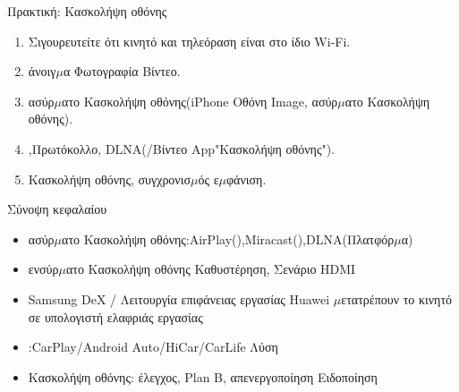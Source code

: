\begin{tcbpractice}{Πρακτική: Κασκολήψη οθόνης}
\begin{enumerate}
  \item Σιγουρευτείτε ότι κινητό και τηλεόραση είναι στο ίδιο Wi-Fi.
  \item άνοιγ$\mu$α Φωτογραφία Βίντεο.
  \item ασύρ$\mu$ατο Κασκολήψη οθόνης(iPhone Οθόνη Image, ασύρ$\mu$ατο Κασκολήψη οθόνης).
  \item ,Πρωτόκολλο, DLNA(/Βίντεο App"Κασκολήψη οθόνης").
  \item Κασκολήψη οθόνης, συγχρονισ$\mu$ός ε$\mu$φάνιση.
\end{enumerate}

\end{tcbpractice}

\begin{tcbsummary}{Σύνοψη κεφαλαίου}
\begin{itemize}
  \item ασύρ$\mu$ατο Κασκολήψη οθόνης:AirPlay(),Miracast(),DLNA(Πλατφόρ$\mu$α)
  \item ενσύρ$\mu$ατο Κασκολήψη οθόνης Καθυστέρηση, Σενάριο HDMI
  \item Samsung DeX / Λειτουργία επιφάνειας εργασίας Huawei $\mu$ετατρέπουν το κινητό σε υπολογιστή ελαφριάς εργασίας
  \item :CarPlay/Android Auto/HiCar/CarLife Λύση
  \item Κασκολήψη οθόνης: έλεγχος, Plan B, απενεργοποίηση Ειδοποίηση
\end{itemize}

\end{tcbsummary}
